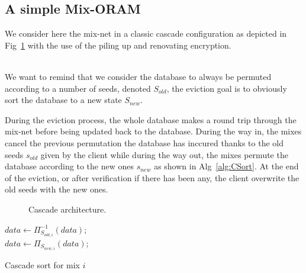 \documentclass[USenglish,oneside,twocolumn]{article}
\begin{document}
\subsection{A simple Mix-ORAM}\label{SMO}
%
We consider here the mix-net in a classic cascade configuration as depicted in Fig~\ref{CascadeArch} with the use of the piling up and renovating encryption.\\\

We want to remind that we consider the database to always be permuted according to a number of seeds, denoted $S_{old}$, the eviction goal is to obviously sort the database to a new state $S_{new}$.

During the eviction process, the whole database makes a round trip through the mix-net before being updated back to the database. During the way in, the mixes cancel the previous permutation the database has inccured thanks to the old seeds $s_{old}$ given by the client while during the way out, the mixes permute the database according to the new ones $s_{new}$ as shown in Alg~\ref{alg:CSort}. At the end of the eviction, or after verification if there has been any, the client overwrite the old seeds with the new ones.\\

\begin{figure} \label{CascadeArch}
\centering
{}
\caption{Cascade architecture.}
\end{figure}

\begin{algorithm}
\DontPrintSemicolon
{}
{
$data \gets \Pi^{-1}_{S_{old,i}}\left ( data \right )$;\\
}
\Else
{
$data \gets \Pi_{S_{new,i}}\left ( data \right )$;\\
}
\caption{Cascade sort for mix $i$}
\label{alg:CSort}
\end{algorithm}
\end{document}
